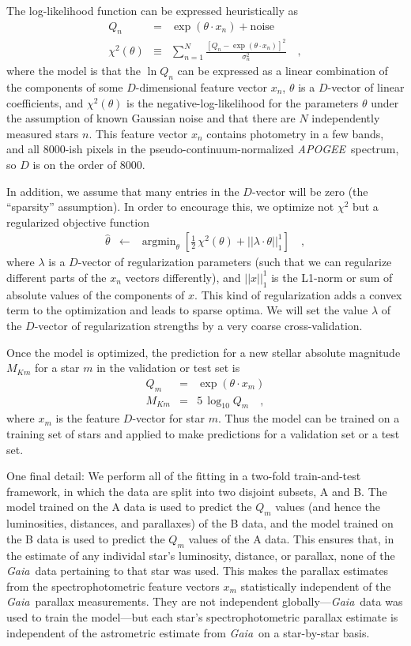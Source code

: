 \documentclass[modern]{aastex62}
\newcommand{\acronym}[1]{{\small{#1}}}
\newcommand{\project}[1]{\textsl{#1}}
\newcommand{\apogee}{\project{\acronym{APOGEE}}}
\newcommand{\gaia}{\project{Gaia}}
\DeclareMathOperator*{\argmin}{argmin}
\begin{document}
The log-likelihood function can be expressed heuristically as
\begin{eqnarray}
Q_n &=& \exp(\theta\cdot x_n) + \mbox{noise}
\\
\chi^2(\theta) &\equiv& \sum_{n=1}^N \frac{[Q_n - \exp(\theta\cdot x_n)]^2}{\sigma_n^2}
\quad ,
\end{eqnarray}
where
the model is that the $\ln Q_n$ can be expressed as a linear combination of the components
of some $D$-dimensional feature vector $x_n$,
$\theta$ is a $D$-vector of linear coefficients,
and $\chi^2(\theta)$ is the negative-log-likelihood for the parameters $\theta$
under the assumption of known Gaussian noise and
that there are $N$ independently measured stars $n$.
This feature vector $x_n$ contains photometry in a few bands, and all 8000-ish pixels
in the pseudo-continuum-normalized \apogee\ spectrum, so $D$ is on the order of 8000.

In addition, we assume that many entries in the $D$-vector will be zero
(the ``sparsity'' assumption).
In order to encourage this, we optimize not $\chi^2$ but a regularized objective function
\begin{eqnarray}
\hat{\theta} &\leftarrow& \argmin_{\theta}\left[\frac{1}{2}\,\chi^2(\theta) + ||\lambda\cdot\theta||_1^1\right]
\quad ,
\end{eqnarray}
where
$\lambda$ is a $D$-vector of regularization parameters (such that we can regularize
different parts of the $x_n$ vectors differently),
and $||x||_1^1$ is the L1-norm or sum of absolute values of the components of $x$.
This kind of regularization adds a convex term to the optimization and leads to
sparse optima.
We will set the value $\lambda$ of the $D$-vector of regularization strengths by a
very coarse cross-validation.

Once the model is optimized, the prediction for a new stellar absolute magnitude
$M_{Km}$ for a star $m$ in the validation or test set is
\begin{eqnarray}
Q_m &=& \exp(\theta\cdot x_m)
\\
M_{Km} &=& 5\,\log_{10} Q_m
\quad ,
\end{eqnarray}
where $x_m$ is the feature $D$-vector for star $m$.
Thus the model can be trained on a training set of stars and applied to make
predictions for a validation set or a test set.

One final detail: We perform all of the fitting in a two-fold train-and-test framework,
in which the data are split into two disjoint subsets, A and B.
The model trained on the A data is used to predict the $Q_m$ values (and hence
the luminosities, distances, and parallaxes) of the B data,
and the model trained on the B data is used to 
predict the $Q_m$ values of the A data.
This ensures that, in the estimate of any individal star's luminosity, distance,
or parallax, none of the \gaia\ data pertaining to that star was used.
This makes the parallax estimates from the spectrophotometric feature vectors
$x_m$ statistically independent of the \gaia\ parallax measurements.
They are not independent globally---\gaia\ data was used to train the model---but
each star's spectrophotometric parallax estimate is independent
of the astrometric estimate from \gaia\ on a star-by-star basis.
\end{document}
